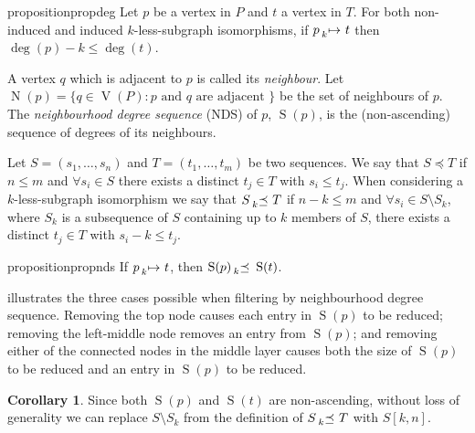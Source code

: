 \documentclass[letterpaper]{article}
\theoremstyle{definition}
\newtheorem{corollary}{Corollary}
\newcommand{\lessmap}[1]{\prescript{}{#1}{\mapsto}\ }
\newcommand{\lesspreceq}[1]{\prescript{}{#1}{\preceq}\ }
\newcommand{\V}{\operatorname{V}}
\newcommand{\N}{\operatorname{N}}
\newcommand{\nds}{\operatorname{S}}
\begin{document}
\begin{restatable}{proposition}{propdeg}\label{prop:deg}
    Let $p$ be a vertex in $P$ and $t$ a vertex in $T$. For both non-induced and induced
    $k$-less-subgraph isomorphisms, if $p \lessmap{k} t$ then
    $\deg(p) - k \le \deg(t)$.
\end{restatable}

A vertex $q$ which is adjacent to $p$ is called its \emph{neighbour}.  Let $\N(p) = \{ q \in \V(P) :
 p \text{ and } q \text{ are adjacent }\}$ be the set of neighbours of $p$.  The \emph{neighbourhood
degree sequence} (NDS) of $p$, $\nds(p)$, is the (non-ascending) sequence of degrees of its
neighbours.

Let $S = ( s_1 , \ldots , s_n )$ and $T = ( t_1 , \ldots , t_m)$ be two sequences.  We say that $S
\preceq T$ if $n \leq m$ and $\forall s_i \in S$ there exists a distinct $t_j \in T$ with $s_i \leq
t_j$.  When considering a $k$-less-subgraph isomorphism we say that $S \lesspreceq{k}
T$ if $n - k \leq m$ and $\forall s_i \in S \setminus S_k$, where $S_k$ is a subsequence of $S$
containing up to $k$ members of $S$, there exists a distinct $t_j \in T$ with $s_i - k \leq t_j$.


\begin{restatable}{proposition}{propnds}\label{prop:nds}
If $p \lessmap{k} t$, then $\nds(p) \lesspreceq{k} \nds(t)$.
\end{restatable}

 illustrates the three cases possible when filtering by neighbourhood degree
sequence.  Removing the top node causes each entry in $\nds(p)$ to be reduced; removing the
left-middle node removes an entry from $\nds(p)$; and removing either of the connected nodes in the
middle layer causes both the size of $\nds(p)$ to be reduced and an entry in $\nds(p)$ to be reduced.

\begin{corollary}
Since both $\nds(p)$ and $\nds(t)$ are non-ascending, without loss of generality we can replace
$S \setminus S_k$ from the definition of $S \lesspreceq{k} T$ with $S[k, n]$.
\end{corollary}


\end{document}

